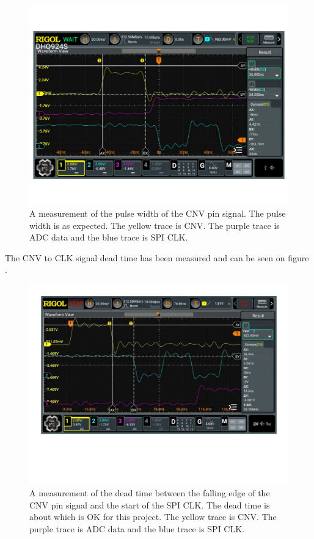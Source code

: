 \begin{figure}[H]
    \centering
    \includegraphics[clip, trim=0 75 0 0, width=1\textwidth]{Appendix/Figures/A_ADCControl_CNV_MEASURE.pdf}
    \caption{A measurement of the pulse width of the CNV pin signal. The pulse width is  as expected. The yellow trace is CNV. The purple trace is ADC data and the blue trace is SPI CLK.}
    \label{fig:A_ADC_CONTROL_CNV}
\end{figure}

The CNV to CLK signal dead time has been measured and can be seen on figure .

\begin{figure}[H]
    \centering
    \includegraphics[clip, trim=0 150 0 0, width=1\textwidth]{Appendix/Figures/A_ADC_CONTROL_DCN_MEAS.pdf}
    \caption{A measurement of the dead time between the falling edge of the CNV pin signal and the start of the SPI CLK. The dead time is about  which is OK for this project.  The yellow trace is CNV. The purple trace is ADC data and the blue trace is SPI CLK.}
    \label{fig:A_ADC_CONTROL_DCN}
\end{figure}

